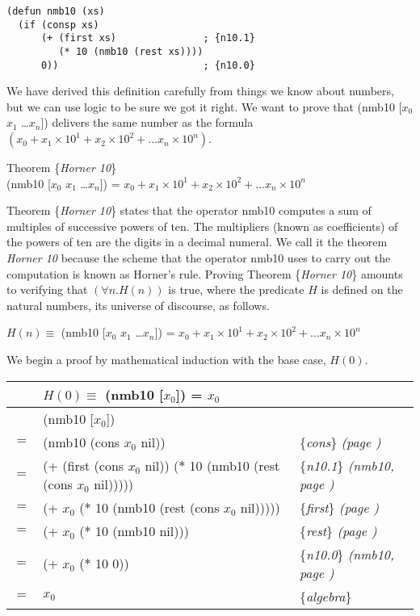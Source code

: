 \label{nmb10-defun}
\begin{Verbatim}
(defun nmb10 (xs)
  (if (consp xs)
      (+ (first xs)               ; {n10.1}
         (* 10 (nmb10 (rest xs))))
      0))                         ; {n10.0}
\end{Verbatim}

We have derived this definition carefully
from things we know about numbers,
but we can use logic to be sure we got it right.
We want to prove that
(nmb10 [$x_0$ $x_1$ \dots $x_{n}$])
delivers the same number as the formula
$(x_0 + x_1 \times 10^1 + x_2 \times 10^2 + \dots x_{n} \times 10^{n})$.
\begin{samepage}
\label{horner10-thm}
\begin{center}
Theorem \{\emph{Horner 10}\} \\
(nmb10 [$x_0$ $x_1$ \dots $x_{n}$]) =
$x_0 + x_1 \times 10^1 + x_2 \times 10^2 + \dots x_{n} \times 10^{n}$
\end{center}
\end{samepage}

Theorem \{\emph{Horner 10}\} states that the operator nmb10
computes a sum of multiples of successive powers of ten.
The multipliers (known as coefficients) of the powers
of ten are the digits in a decimal numeral.
We call it the theorem \emph{Horner 10} because
the scheme that the operator nmb10 uses to carry out the computation is
known as Horner's rule.
Proving Theorem \{\emph{Horner 10}\} amounts to
verifying that $(\forall n.H(n))$ is true,
where the predicate $H$ is defined on the natural numbers,
its universe of discourse, as follows.
\begin{center}
$H(n) \equiv$
(nmb10 [$x_0$ $x_1$ \dots $x_{n}$]) =
$x_0 + x_1 \times 10^1 + x_2 \times 10^2 + \dots x_{n} \times 10^{n}$
\end{center}

We begin a proof by mathematical induction with the base case, $H(0)$.
\begin{center}
\begin{tabular}{lll}
    & $H(0) \equiv$ (nmb10 [$x_0$]) = $x_0$ & \\
\hline
    & (nmb10 [$x_0$])           & \\
$=$ & (nmb10 (cons $x_0$ nil))  & \{\emph{cons}\} \emph{(page \pageref{first-rest-cons})} \\
$=$ & (+ (first (cons $x_0$ nil)) ($*$ 10 (nmb10 (rest (cons $x_0$ nil)))))  & \{\emph{n10.1}\} \emph{(nmb10, page \pageref{nmb10-defun})} \\
$=$ & (+ $x_0$ ($*$ 10 (nmb10 (rest (cons $x_0$ nil)))))  & \{\emph{first}\} \emph{(page \pageref{first-rest-cons})} \\
$=$ & (+ $x_0$ ($*$ 10 (nmb10 nil)))  & \{\emph{rest}\} \emph{(page \pageref{first-rest-cons})} \\
$=$ & (+ $x_0$ ($*$ 10 0))  & \{\emph{n10.0}\} \emph{(nmb10, page \pageref{nmb10-defun})} \\
$=$ & $x_0$  & \{\emph{algebra}\} \\
\end{tabular}
\end{center}

